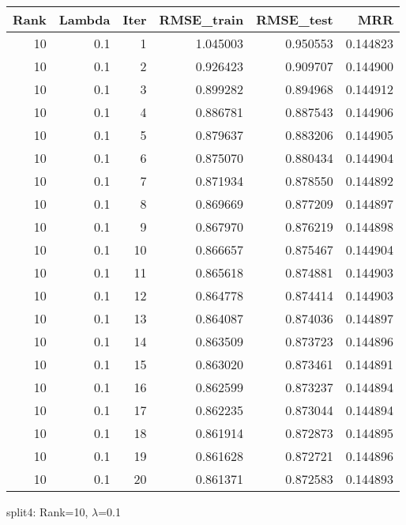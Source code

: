 \begin{tabular}{rrrrrr}
\toprule
 Rank &  Lambda &  Iter &  RMSE\_train &  RMSE\_test &       MRR \\
\midrule
   10 &     0.1 &     1 &    1.045003 &   0.950553 &  0.144823 \\
   10 &     0.1 &     2 &    0.926423 &   0.909707 &  0.144900 \\
   10 &     0.1 &     3 &    0.899282 &   0.894968 &  0.144912 \\
   10 &     0.1 &     4 &    0.886781 &   0.887543 &  0.144906 \\
   10 &     0.1 &     5 &    0.879637 &   0.883206 &  0.144905 \\
   10 &     0.1 &     6 &    0.875070 &   0.880434 &  0.144904 \\
   10 &     0.1 &     7 &    0.871934 &   0.878550 &  0.144892 \\
   10 &     0.1 &     8 &    0.869669 &   0.877209 &  0.144897 \\
   10 &     0.1 &     9 &    0.867970 &   0.876219 &  0.144898 \\
   10 &     0.1 &    10 &    0.866657 &   0.875467 &  0.144904 \\
   10 &     0.1 &    11 &    0.865618 &   0.874881 &  0.144903 \\
   10 &     0.1 &    12 &    0.864778 &   0.874414 &  0.144903 \\
   10 &     0.1 &    13 &    0.864087 &   0.874036 &  0.144897 \\
   10 &     0.1 &    14 &    0.863509 &   0.873723 &  0.144896 \\
   10 &     0.1 &    15 &    0.863020 &   0.873461 &  0.144891 \\
   10 &     0.1 &    16 &    0.862599 &   0.873237 &  0.144894 \\
   10 &     0.1 &    17 &    0.862235 &   0.873044 &  0.144894 \\
   10 &     0.1 &    18 &    0.861914 &   0.872873 &  0.144895 \\
   10 &     0.1 &    19 &    0.861628 &   0.872721 &  0.144896 \\
   10 &     0.1 &    20 &    0.861371 &   0.872583 &  0.144893 \\
\bottomrule
\end{tabular}

\caption{split4: Rank=10, $\lambda$=0.1}
